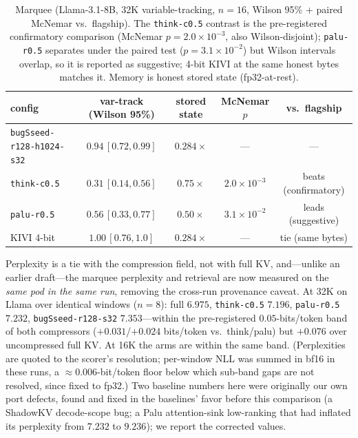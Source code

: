 \documentclass[11pt]{article}
\begin{document}
\begin{table}[t]
\centering
\caption{Marquee (Llama-3.1-8B, 32K variable-tracking, $n{=}16$, Wilson 95\% +
paired McNemar vs.\ flagship). The \texttt{think-c0.5} contrast is the
pre-registered confirmatory comparison (McNemar $p{=}2.0\!\times\!10^{-3}$, also
Wilson-disjoint); \texttt{palu-r0.5} separates under the paired test
($p{=}3.1\!\times\!10^{-2}$) but Wilson intervals overlap, so it is reported as
suggestive; 4-bit KIVI at the same honest bytes matches it. Memory is honest
stored state (fp32-at-rest).}
\label{tab:marquee}
\small
\begin{tabular}{lcccc}
\toprule
config & var-track (Wilson 95\%) & stored state & McNemar $p$ & vs.\ flagship \\
\midrule
\texttt{bugSseed-r128-h1024-s32} & $\mathbf{0.94}\,[0.72,0.99]$ & $0.284\times$ & --- & --- \\
\texttt{think-c0.5}              & $0.31\,[0.14,0.56]$          & $0.75\times$ & $2.0\!\times\!10^{-3}$ & beats (confirmatory) \\
\texttt{palu-r0.5}               & $0.56\,[0.33,0.77]$          & $0.50\times$ & $3.1\!\times\!10^{-2}$ & leads (suggestive) \\
KIVI 4-bit                       & $1.00\,[0.76,1.0]$          & $0.284\times$ & --- & tie (same bytes) \\
\bottomrule
\end{tabular}
\end{table}

Perplexity is a tie with the compression field, not with full KV, and---unlike an
earlier draft---the marquee perplexity and retrieval are now measured on the
\emph{same pod in the same run}, removing the cross-run provenance caveat. At 32K
on Llama over identical windows ($n{=}8$): full $6.975$, \texttt{think-c0.5}
$7.196$, \texttt{palu-r0.5} $7.232$, \texttt{bugSseed-r128-s32} $7.353$---within
the pre-registered $0.05$-bits/token band of both compressors ($+0.031$/$+0.024$
bits/token vs.\ think/palu) but $+0.076$ over uncompressed full KV. At 16K the
arms are within the same band. (Perplexities are quoted to the scorer's
resolution; per-window NLL was summed in bf16 in these runs, a
$\approx0.006$-bit/token floor below which sub-band gaps are not resolved, since
fixed to fp32.) Two baseline numbers here were originally our
own port defects, found and fixed in the baselines' favor before this comparison
(a ShadowKV decode-scope bug; a Palu attention-sink low-ranking that had inflated
its perplexity from $7.232$ to $9.236$); we report the corrected values.
\end{document}
